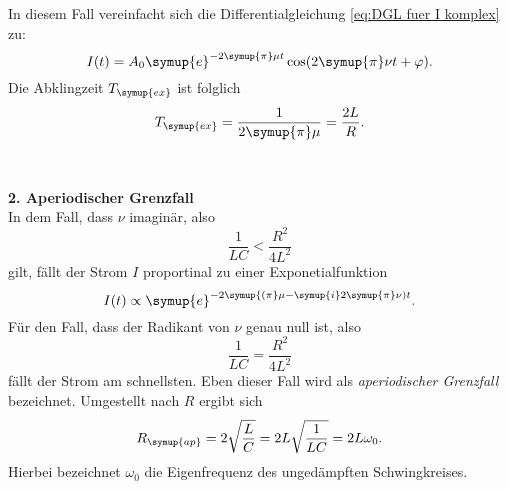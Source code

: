 In diesem Fall vereinfacht sich die Differentialgleichung \eqref{eq:DGL fuer I komplex} zu:
\begin{equation}
    I(t)=A_{0} \symup{e}^{-2\symup{\pi}\mu t} \cos(2\symup{\pi}\nu t + \varphi).
\end{equation}
Die Abklingzeit $T_{\symup{ex}}$ ist folglich
\begin{equation}
    T_{\symup{ex}}=\frac{1}{2\symup{\pi}\mu}=\frac{2L}{R}.
    \label{eq:Abklingzeit}
\end{equation}
\\
\\
\textbf{2. Aperiodischer Grenzfall} \\
In dem Fall, dass $\nu$ imaginär, also
\begin{equation*}
    \frac{1}{LC} < \frac{R^{2}}{4L^{2}}
\end{equation*}
gilt, fällt der Strom $I$ proportinal zu einer Exponetialfunktion
\begin{equation*}
    I(t) \propto \symup{e}^{-2\symup{(\pi}\mu-\symup{i}2\symup{\pi}\nu)t}.
\end{equation*}
Für den Fall, dass der Radikant von $\nu$ genau null ist, also
\begin{equation*}
    \frac{1}{LC} = \frac{R^{2}}{4L^{2}}
\end{equation*}
fällt der Strom am schnellsten. Eben dieser Fall wird als \textit{aperiodischer Grenzfall} bezeichnet. Umgestellt nach $R$ ergibt sich
\begin{equation}
    R_{\symup{ap}} = 2\sqrt{\frac{L}{C}} = 2L\sqrt{\frac{1}{LC}} = 2L\omega_0.
    \label{eq:Widerstand aperiodischer Grenzfall}
\end{equation}
Hierbei bezeichnet $\omega_0$ die Eigenfrequenz des ungedämpften Schwingkreises.

